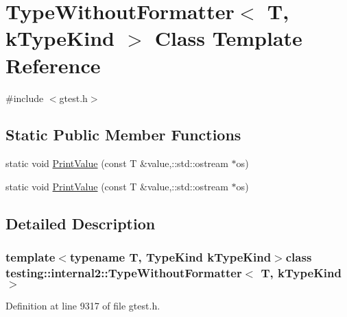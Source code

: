 \hypertarget{classtesting_1_1internal2_1_1TypeWithoutFormatter}{\section{\-Type\-Without\-Formatter$<$ \-T, k\-Type\-Kind $>$ \-Class \-Template \-Reference}
\label{d7/de8/classtesting_1_1internal2_1_1TypeWithoutFormatter}
}


{\ttfamily \#include $<$gtest.\-h$>$}

\subsection*{\-Static \-Public \-Member \-Functions}
\begin{DoxyCompactItemize}
\item 
static void \hyperlink{classtesting_1_1internal2_1_1TypeWithoutFormatter_a3ac7770f918210bb197165f28880c544}{\-Print\-Value} (const \-T \&value,\-::std\-::ostream $\ast$os)
\item 
static void \hyperlink{classtesting_1_1internal2_1_1TypeWithoutFormatter_a3ac7770f918210bb197165f28880c544}{\-Print\-Value} (const \-T \&value,\-::std\-::ostream $\ast$os)
\end{DoxyCompactItemize}


\subsection{\-Detailed \-Description}
\subsubsection*{template$<$typename T, \-Type\-Kind k\-Type\-Kind$>$class testing\-::internal2\-::\-Type\-Without\-Formatter$<$ T, k\-Type\-Kind $>$}



\-Definition at line 9317 of file gtest.\-h.



